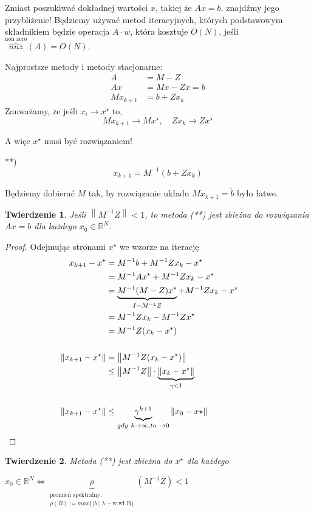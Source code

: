 \documentclass[hidelinks,a4paper]{article}
\newcommand{\RR}{\mathbb{R}}
\newcommand{\ra}{\rightarrow}
\newcommand{\eye}{I}
\newcommand{\norm}[1]{\left\lVert#1\right\rVert}
\newtheorem{twierdz}{Twierdzenie}
\begin{document}
Zmiast poszukiwać dokładnej wartości $x$, takiej że $Ax=b$, znajdźmy jego przybliżenie! Będziemy używać metod iteracyjnych, których podstawowym składnikiem będzie operacja $A \cdot w$, która kosztuje $O(N)$, jeśli $\overbrace{nnz}^{\textrm{non zero}}(A) = O(N)$.


Najprostsze metody i metody stacjonarne:
\begin{align*}
	A & = M - Z \\
	Ax & = Mx - Zx = b\\
	Mx_{k+1} & = b + Zx_k 
\end{align*}
Zauważamy, że jeśli $x_i \ra x^\star$ to,
\[
	Mx_{k+1} \ra Mx^\star,\quad Zx_k \ra Zx^\star
\]

A więc $x^\star$ musi być rozwiązaniem!

**)
\[
	x_{k+1} = M^{-1}(b + Zx_k)
\]

Będziemy dobierać $M$ tak, by rozwiązanie układu $Mx_{k+1} = \tilde{b}$ było łatwe.

\begin{twierdz}
	Jeśli $\norm{M^{-1}Z} < 1$, to metoda (**) jest zbieżna do rozwiązania $Ax = b$ dla każdego $x_0 \in \RR^N$.
\end{twierdz}


\begin{proof}
  Odejmując stronami $x^\star$ we wzorze na iterację
  \begin{align*}
	x_{k+1} - x^\star & = M^{-1}b + M^{-1}Zx_k - x^\star \\
		& = M^{-1}Ax^\star + M^{-1}Zx_k - x^\star \\
		& = \underbrace{M^{-1}(M-Z)x^\star}_{\eye - M^{-1}Z} + M^{-1}Zx_k - x^\star \\
		& = M^{-1}Zx_k - M^{-1}Zx^\star\\
		& = M^{-1}Z(x_k - x^\star) \\ \\
		\norm{x_{k+1} - x^\star} & = \norm{M^{-1}Z(x_k - x^\star)} \\
		& \leq \norm{M^{-1}Z} \cdot \underbrace{\norm{x_k - x^\star}}_{\gamma < 1} \\ \\
		\norm{x_{k+1} - x^\star} & \leq \underbrace{\gamma^{k+1}}_{gdy\ k \ra \infty, to\ \ra 0} \norm{x_0 - x\star}
		 && \qedhere
  \end{align*}
\end{proof}
	
\begin{twierdz}
	Metoda (**) jest zbieżna do $x^\star$ dla każdego

    $x_0 \in \RR^N \iff \underbrace{\rho}_{\substack{\textrm{promień spektralny: }\\ \rho(B) := max\{| \lambda|: \lambda - \textrm{w.wł B}\}}}(M^{-1}Z) < 1$
\end{twierdz}
\end{document}
